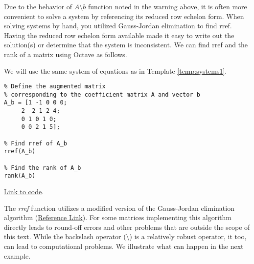\documentclass{ximera}
\begin{document}
Due to the behavior of $A\setminus b$ function noted in the warning above, it is often more convenient to solve a system by referencing its reduced row echelon form.  When solving systems by hand, you utilized Gauss-Jordan elimination to find rref.  Having the reduced row echelon form available made it easy to write out the solution(s) or determine that the system is inconsistent.  We can find rref and the rank of a matrix using Octave as follows.

\begin{template}\label{temp:rref}
We will use the same system of equations as in Template \ref{temp:systems1}.
    \begin{verbatim}
% Define the augmented matrix 
% corresponding to the coefficient matrix A and vector b
A_b = [1 -1 0 0 0;
     2 -2 1 2 4;
     0 1 0 1 0;
     0 0 2 1 5];
     
% Find rref of A_b
rref(A_b)

% Find the rank of A_b
rank(A_b)
    \end{verbatim}

\href{https://sagecell.sagemath.org/?z=eJxFjsEKwjAMhu-FvsN_Gehh0A49iYfB8CVEpOvSWWSt1Co-vumkmBCS_-cjSYOBnA-EfCOY17xQyDRhMTn5D2xMiZ6PGCYfZuS4UjaSc956JivXw4QJb7I5JoxS9NcRR5w1Wg1V8iAFSnRoO2huu-oo6F_9DYXC7C_VkaLByfMBfsYhOvB6KYrY8LSVgoUJ91V8ASwdNw8=&lang=octave&interacts=eJyLjgUAARUAuQ==}{Link to code}.    
\end{template}

\begin{warning}
    The \emph{rref} function utilizes a modified version of the Gauss-Jordan elimination algorithm (\href{https://www.mathworks.com/help/matlab/ref/rref.html}{Reference Link}).  For some matrices implementing this algorithm directly leads to round-off errors and other problems that are outside the scope of this text.  While the backslash operator ($\setminus$) is a relatively robust operator, it too, can lead to computational problems.  We illustrate what can happen in the next example.   
\end{warning}
\end{document}
